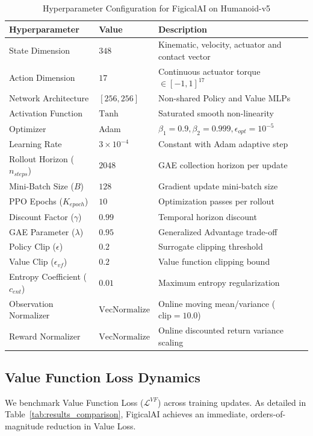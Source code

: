 \documentclass{article}
\begin{document}
\begin{table}[h]
\centering
\caption{Hyperparameter Configuration for FigicalAI on Humanoid-v5}
\label{tab:hyperparams}
\begin{tabular}{lll}
\toprule
\textbf{Hyperparameter} & \textbf{Value} & \textbf{Description} \\
\midrule
State Dimension & $348$ & Kinematic, velocity, actuator and contact vector \\
Action Dimension & $17$ & Continuous actuator torque $\in [-1, 1]^{17}$ \\
Network Architecture & $[256, 256]$ & Non-shared Policy and Value MLPs \\
Activation Function & $\text{Tanh}$ & Saturated smooth non-linearity \\
Optimizer & Adam & $\beta_1 = 0.9, \beta_2 = 0.999, \epsilon_{opt} = 10^{-5}$ \\
Learning Rate & $3 \times 10^{-4}$ & Constant with Adam adaptive step \\
Rollout Horizon ($n_{steps}$) & $2048$ & GAE collection horizon per update \\
Mini-Batch Size ($B$) & $128$ & Gradient update mini-batch size \\
PPO Epochs ($K_{epoch}$) & $10$ & Optimization passes per rollout \\
Discount Factor ($\gamma$) & $0.99$ & Temporal horizon discount \\
GAE Parameter ($\lambda$) & $0.95$ & Generalized Advantage trade-off \\
Policy Clip ($\epsilon$) & $0.2$ & Surrogate clipping threshold \\
Value Clip ($\epsilon_{vf}$) & $0.2$ & Value function clipping bound \\
Entropy Coefficient ($c_{ent}$) & $0.01$ & Maximum entropy regularization \\
Observation Normalizer & $\text{VecNormalize}$ & Online moving mean/variance ($\text{clip} = 10.0$) \\
Reward Normalizer & $\text{VecNormalize}$ & Online discounted return variance scaling \\
\bottomrule
\end{tabular}
\end{table}

\subsection{Value Function Loss Dynamics}
We benchmark Value Function Loss ($\mathcal{L}^{VF}$) across training updates. As detailed in Table~\ref{tab:results_comparison}, FigicalAI achieves an immediate, orders-of-magnitude reduction in Value Loss.
\end{document}
